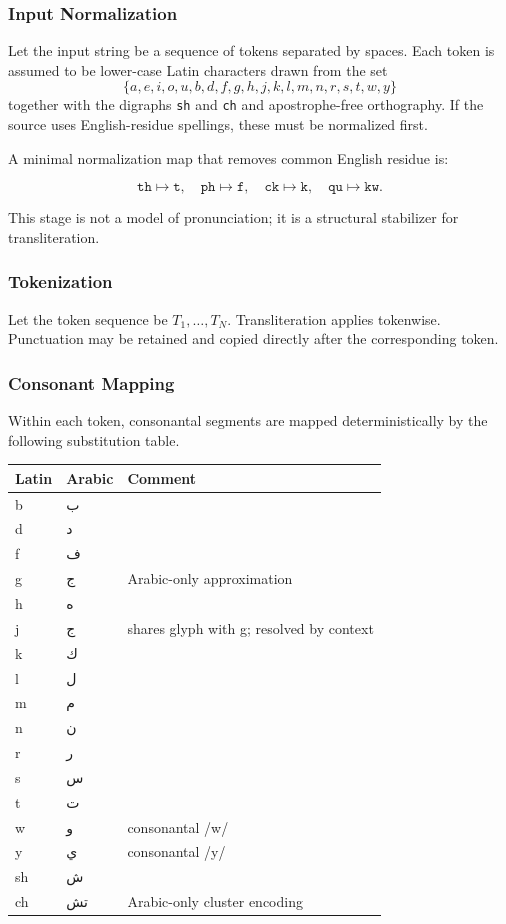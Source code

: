\documentclass[12pt]{article}
\newcommand{\AR}[1]{\foreignlanguage{arabic}{#1}}
\begin{document}
\subsubsection{Input Normalization}

Let the input string be a sequence of tokens separated by spaces. Each token is assumed to be lower-case Latin characters drawn from the set
\[
\{a,e,i,o,u,b,d,f,g,h,j,k,l,m,n,r,s,t,w,y\}
\]
together with the digraphs \texttt{sh} and \texttt{ch} and apostrophe-free orthography. If the source uses English-residue spellings, these must be normalized first.

A minimal normalization map that removes common English residue is:

\[
\texttt{th} \mapsto \texttt{t},\quad
\texttt{ph} \mapsto \texttt{f},\quad
\texttt{ck} \mapsto \texttt{k},\quad
\texttt{qu} \mapsto \texttt{kw}.
\]

This stage is not a model of pronunciation; it is a structural stabilizer for transliteration.

\subsubsection{Tokenization}

Let the token sequence be $T_1,\dots,T_N$. Transliteration applies tokenwise. Punctuation may be retained and copied directly after the corresponding token.

\subsubsection{Consonant Mapping}

Within each token, consonantal segments are mapped deterministically by the following substitution table.

\begin{center}
\begin{tabular}{lll}
Latin & Arabic & Comment \\
\hline
b & \AR{ب} & \\
d & \AR{د} & \\
f & \AR{ف} & \\
g & \AR{ج} & Arabic-only approximation \\
h & \AR{ه} & \\
j & \AR{ج} & shares glyph with g; resolved by context \\
k & \AR{ك} & \\
l & \AR{ل} & \\
m & \AR{م} & \\
n & \AR{ن} & \\
r & \AR{ر} & \\
s & \AR{س} & \\
t & \AR{ت} & \\
w & \AR{و} & consonantal /w/ \\
y & \AR{ي} & consonantal /y/ \\
sh & \AR{ش} & \\
ch & \AR{تش} & Arabic-only cluster encoding \\
\end{tabular}
\end{center}
\end{document}
